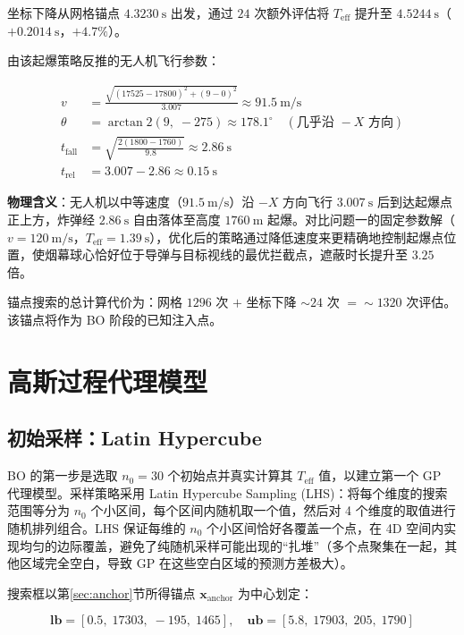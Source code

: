 \documentclass[12pt,a4paper]{ctexart}
\newcommand{\Teff}{T_{\text{eff}}}
\begin{document}
坐标下降从网格锚点 $4.3230\ \mathrm{s}$ 出发，通过 $24$ 次额外评估将 $\Teff$ 提升至 $4.5244\ \mathrm{s}$（$+0.2014\ \mathrm{s}$，$+4.7\%$）。

由该起爆策略反推的无人机飞行参数：

\begin{align}
v &= \frac{\sqrt{(17525-17800)^2 + (9-0)^2}}{3.007} \approx 91.5\ \mathrm{m/s} \\
\theta &= \arctan2(9,\; -275) \approx 178.1^\circ \quad (\text{几乎沿 } -X \text{ 方向}) \\
t_{\text{fall}} &= \sqrt{\frac{2(1800-1760)}{9.8}} \approx 2.86\ \mathrm{s} \\
t_{\text{rel}} &= 3.007 - 2.86 \approx 0.15\ \mathrm{s}
\end{align}

\textbf{物理含义}：无人机以中等速度（$91.5\ \mathrm{m/s}$）沿 $-X$ 方向飞行 $3.007\ \mathrm{s}$ 后到达起爆点正上方，炸弹经 $2.86\ \mathrm{s}$ 自由落体至高度 $1760\ \mathrm{m}$ 起爆。对比问题一的固定参数解（$v=120\ \mathrm{m/s}$，$\Teff=1.39\ \mathrm{s}$），优化后的策略通过降低速度来更精确地控制起爆点位置，使烟幕球心恰好位于导弹与目标视线的最优拦截点，遮蔽时长提升至 $3.25$ 倍。

锚点搜索的总计算代价为：网格 $1296$ 次 $+$ 坐标下降 $\sim 24$ 次 $= \sim 1320$ 次评估。该锚点将作为 BO 阶段的已知注入点。

\section{高斯过程代理模型}
\label{sec:gp}

\subsection{初始采样：Latin Hypercube}

BO 的第一步是选取 $n_0 = 30$ 个初始点并真实计算其 $\Teff$ 值，以建立第一个 GP 代理模型。采样策略采用 Latin Hypercube Sampling (LHS)：将每个维度的搜索范围等分为 $n_0$ 个小区间，每个区间内随机取一个值，然后对 4 个维度的取值进行随机排列组合。LHS 保证每维的 $n_0$ 个小区间恰好各覆盖一个点，在 4D 空间内实现均匀的边际覆盖，避免了纯随机采样可能出现的``扎堆''（多个点聚集在一起，其他区域完全空白，导致 GP 在这些空白区域的预测方差极大）。

搜索框以第\ref{sec:anchor}节所得锚点 $\mathbf{x}_{\text{anchor}}$ 为中心划定：

\begin{equation}
\mathbf{lb} = [0.5,\; 17303,\; -195,\; 1465], \quad
\mathbf{ub} = [5.8,\; 17903,\; 205,\; 1790]
\end{equation}
\end{document}
